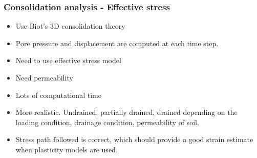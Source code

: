 \documentclass[notes]{beamer}
\begin{document}
\begin{frame}
\frametitle{Consolidation analysis - Effective stress}
\begin{itemize}
	\item Use Biot's 3D consolidation theory
	\item Pore pressure and displacement are computed at each time step.
	\item Need to use effective stress model
	\item Need permeability
	\item Lots of computational time
	\item More realistic. Undrained, partially drained, drained depending on the loading condition, drainage condition, permeability of soil.
	\item Stress path followed is correct, which should provide a good strain estimate when plasticity models are used.
\end{itemize}
\end{frame}


\end{document}
